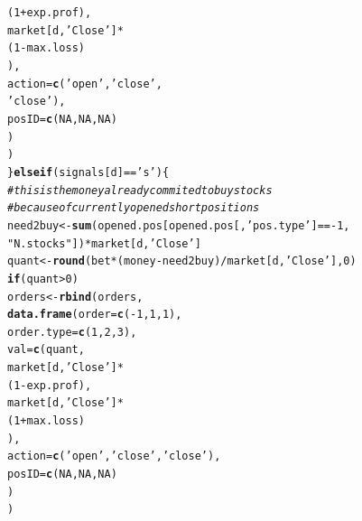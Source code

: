 \documentclass{article}\usepackage[]{graphicx}\usepackage[]{color}
\makeatletter
\newcommand{\hlnum}[1]{\textcolor[rgb]{0.686,0.059,0.569}{#1}}%
\newcommand{\hlstr}[1]{\textcolor[rgb]{0.192,0.494,0.8}{#1}}%
\newcommand{\hlcom}[1]{\textcolor[rgb]{0.678,0.584,0.686}{\textit{#1}}}%
\newcommand{\hlopt}[1]{\textcolor[rgb]{0,0,0}{#1}}%
\newcommand{\hlstd}[1]{\textcolor[rgb]{0.345,0.345,0.345}{#1}}%
\newcommand{\hlkwa}[1]{\textcolor[rgb]{0.161,0.373,0.58}{\textbf{#1}}}%
\newcommand{\hlkwb}[1]{\textcolor[rgb]{0.69,0.353,0.396}{#1}}%
\newcommand{\hlkwc}[1]{\textcolor[rgb]{0.333,0.667,0.333}{#1}}%
\newcommand{\hlkwd}[1]{\textcolor[rgb]{0.737,0.353,0.396}{\textbf{#1}}}%
\newenvironment{kframe}{%
 \def\at@end@of@kframe{}%
 \ifinner\ifhmode%
  \def\at@end@of@kframe{\end{minipage}}%
  \begin{minipage}{\columnwidth}%
 \fi\fi%
 \def\FrameCommand##1{\hskip\@totalleftmargin \hskip-\fboxsep
 \colorbox{shadecolor}{##1}\hskip-\fboxsep
     \hskip-\linewidth \hskip-\@totalleftmargin \hskip\columnwidth}%
 \MakeFramed {\advance\hsize-\width
   \@totalleftmargin\z@ \linewidth\hsize
   \@setminipage}}%
 {\par\unskip\endMakeFramed%
 \at@end@of@kframe}
\newenvironment{knitrout}{}{} %
\makeatother
\begin{document}
\begin{CJK*}{UTF8}{gkai}
\begin{knitrout}
\begin{kframe}
\begin{alltt}
                                           \hlstd{(}\hlnum{1}\hlopt{+}\hlstd{exp.prof),}
                                         \hlstd{market[d,} \hlstr{'Close'}\hlstd{]}\hlopt{*}
                                           \hlstd{(}\hlnum{1}\hlopt{-}\hlstd{max.loss)}
                                         \hlstd{),}
                                 \hlkwc{action} \hlstd{=} \hlkwd{c}\hlstd{(}\hlstr{'open'}\hlstd{,} \hlstr{'close'}\hlstd{,}
                                            \hlstr{'close'}\hlstd{),}
                                 \hlkwc{posID} \hlstd{=} \hlkwd{c}\hlstd{(}\hlnum{NA}\hlstd{,} \hlnum{NA}\hlstd{,} \hlnum{NA}\hlstd{)}
                                 \hlstd{)}
                      \hlstd{)}
  \hlstd{\}} \hlkwa{else if} \hlstd{(signals[d]} \hlopt{==} \hlstr{'s'}\hlstd{) \{}
    \hlcom{#this is the money already commited to buy stocks}
    \hlcom{#because of currently opened short positions}
    \hlstd{need2buy} \hlkwb{<-} \hlkwd{sum}\hlstd{(opened.pos[opened.pos[,} \hlstr{'pos.type'}\hlstd{]} \hlopt{== -}\hlnum{1}\hlstd{,}
                               \hlstr{"N.stocks"}\hlstd{])}\hlopt{*}\hlstd{market[d,} \hlstr{'Close'}\hlstd{]}
    \hlstd{quant} \hlkwb{<-} \hlkwd{round}\hlstd{(bet}\hlopt{*}\hlstd{(money} \hlopt{-} \hlstd{need2buy)}\hlopt{/}\hlstd{market[d,} \hlstr{'Close'}\hlstd{],} \hlnum{0}\hlstd{)}
    \hlkwa{if}\hlstd{(quant} \hlopt{>}\hlnum{0}\hlstd{)}
      \hlstd{orders} \hlkwb{<-} \hlkwd{rbind}\hlstd{(orders,}
                      \hlkwd{data.frame}\hlstd{(}\hlkwc{order} \hlstd{=} \hlkwd{c}\hlstd{(}\hlopt{-}\hlnum{1}\hlstd{,} \hlnum{1}\hlstd{,} \hlnum{1}\hlstd{),}
                                 \hlkwc{order.type} \hlstd{=} \hlkwd{c}\hlstd{(}\hlnum{1}\hlstd{,} \hlnum{2}\hlstd{,} \hlnum{3}\hlstd{),}
                                 \hlkwc{val} \hlstd{=} \hlkwd{c}\hlstd{(quant,}
                                         \hlstd{market[d,} \hlstr{'Close'}\hlstd{]}\hlopt{*}
                                           \hlstd{(}\hlnum{1}\hlopt{-}\hlstd{exp.prof),}
                                         \hlstd{market[d,} \hlstr{'Close'}\hlstd{]}\hlopt{*}
                                           \hlstd{(}\hlnum{1} \hlopt{+} \hlstd{max.loss)}
                                         \hlstd{),}
                                 \hlkwc{action} \hlstd{=} \hlkwd{c}\hlstd{(}\hlstr{'open'}\hlstd{,} \hlstr{'close'}\hlstd{,} \hlstr{'close'}\hlstd{),}
                                 \hlkwc{posID} \hlstd{=} \hlkwd{c}\hlstd{(}\hlnum{NA}\hlstd{,} \hlnum{NA}\hlstd{,} \hlnum{NA}\hlstd{)}
                                 \hlstd{)}
                      \hlstd{)}

\end{alltt}
\end{kframe}
\end{knitrout}
\end{CJK*}
\end{document}
